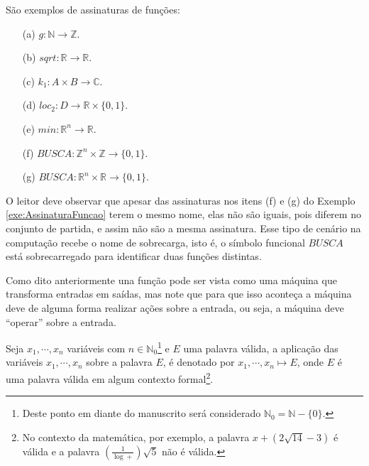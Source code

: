 \begin{example}\label{exe:AssinaturaFuncao}
	São exemplos de assinaturas de funções:
	\begin{itemize}
		\item[(a)] $g : \mathbb{N} \rightarrow \mathbb{Z}$.
		\item[(b)] $sqrt : \mathbb{R} \rightarrow \mathbb{R}$.
		\item[(c)] $k_1 : A \times B \rightarrow \mathbb{C}$.
		\item[(d)] $loc_2 : D \rightarrow \mathbb{R} \times \{0,1\}$.
		\item[(e)] $min : \mathbb{R}^n \rightarrow \mathbb{R}$.
		\item[(f)] $BUSCA : \mathbb{Z}^n \times \mathbb{Z} \rightarrow \{0,1\}$.
		\item[(g)] $BUSCA : \mathbb{R}^n \times \mathbb{R} \rightarrow \{0,1\}$.
	\end{itemize}
\end{example}

\begin{remark}
	O leitor deve observar que apesar das assinaturas nos itens (f) e (g) do Exemplo \ref{exe:AssinaturaFuncao} terem o mesmo nome, elas não são iguais, pois diferem no conjunto de partida, e assim não são a mesma assinatura. Esse tipo de cenário na computação recebe o nome de sobrecarga, isto é, o símbolo funcional $BUSCA$ está sobrecarregado para identificar duas funções distintas.
\end{remark}

Como dito anteriormente una função pode ser vista como uma máquina que transforma entradas em saídas, mas note que para que isso aconteça a máquina deve de alguma forma realizar ações sobre a entrada, ou seja, a máquina deve ``operar'' sobre a entrada. 

\begin{definition}[Aplicação]\label{def:Aplicacao}
	Seja $x_1, \cdots, x_n$ variáveis com $n \in \mathbb{N}_0$\footnote{Deste ponto em diante do manuscrito será considerado $\mathbb{N}_0 = \mathbb{N} - \{0\}.$} e $E$ uma palavra válida, a aplicação das variáveis $x_1, \cdots, x_n$ sobre a palavra $E$, é denotado por  $x_1, \cdots, x_n \mapsto E$, onde $E$ é uma palavra válida em algum contexto formal\footnote{No contexto da matemática, por exemplo, a palavra $x + (2\sqrt{14} - 3)$ é válida e a palavra $(\frac{1}{\log +})\sqrt{5}$ não é válida.}.
\end{definition}


